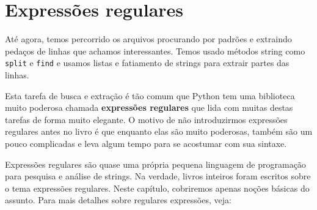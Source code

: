 
\chapter{Expressões regulares}

Até agora, temos percorrido os arquivos procurando por padrões e extraindo pedaços de linhas
que achamos interessantes. Temos usado métodos string como {\tt split} e {\tt find} e usamos
listas e fatiamento de strings para extrair partes das linhas.


Esta tarefa de busca e extração é tão comum que Python tem uma biblioteca muito poderosa
chamada {\bf expressões regulares} que lida com muitas destas tarefas de forma muito elegante.
O motivo de não introduzirmos expressões regulares antes no livro é que enquanto elas são muito 
poderosas, também são um pouco complicadas e leva algum tempo para se acostumar com sua sintaxe.

Expressões regulares são quase uma própria pequena linguagem de programação para pesquisa e 
análise de strings. Na verdade, livros inteiros foram escritos sobre o tema expressões regulares. 
Neste capítulo, cobriremos apenas noções básicas do assunto. 
Para mais detalhes sobre regulares expressões, veja:


